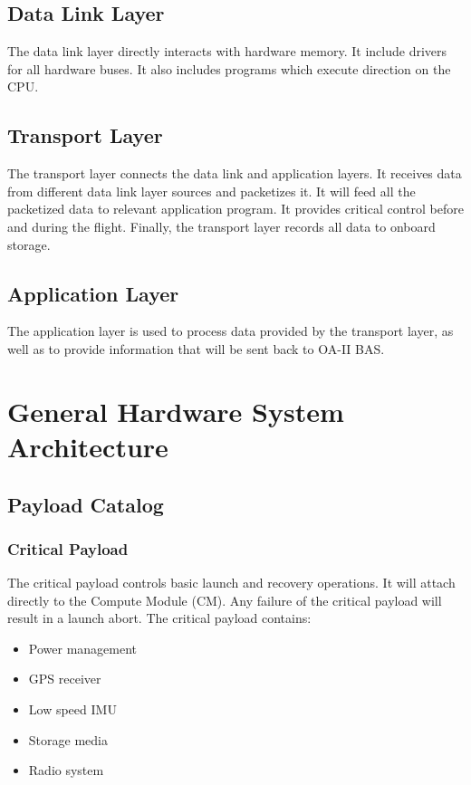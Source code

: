 \documentclass[12pt,article]{memoir}
\begin{document}
\section{Data Link Layer}
The data link layer directly interacts with hardware memory. It include drivers for all hardware buses. It also includes programs which execute direction on the CPU.
\section{Transport Layer}
The transport layer connects the data link and application layers. It receives data from different data link layer sources and packetizes it. It will feed all the packetized data to relevant application program. It provides critical control before and during the flight. Finally, the transport layer records all data to onboard storage.
\section{Application Layer}
The application layer is used to process data provided by the transport layer, as well as to provide information that will be sent back to OA-II BAS.

\newpage

\chapter{General Hardware System Architecture}
\section{Payload Catalog}
\subsection{Critical Payload}
The critical payload controls basic launch and recovery operations. It will attach directly to the Compute Module (CM). Any failure of the critical payload will result in a launch abort. The critical payload contains:
\begin{itemize}
\item Power management
\item GPS receiver
\item Low speed IMU
\item Storage media
\item Radio system
\end{itemize}
\end{document}
